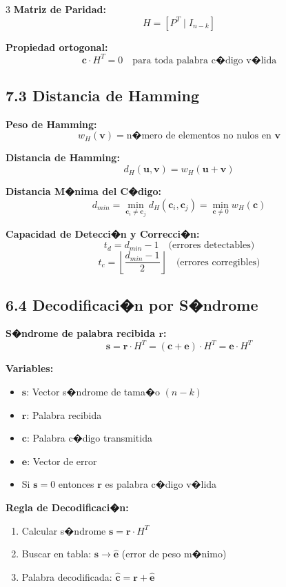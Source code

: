 ﻿\documentclass[8pt,a4paper]{article}
\begin{document}
\begin{multicols}{3}
\textbf{Matriz de Paridad:}
\[
H = [P^T \mid I_{n-k}]
\]

\textbf{Propiedad ortogonal:}
\[
\mathbf{c} \cdot H^T = 0 \quad \text{para toda palabra c�digo v�lida}
\]

\vspace{-2mm}
\subsection*{\small 7.3 Distancia de Hamming}
\vspace{-2mm}

\textbf{Peso de Hamming:}
\[
w_H(\mathbf{v}) = \text{n�mero de elementos no nulos en } \mathbf{v}
\]

\textbf{Distancia de Hamming:}
\[
d_H(\mathbf{u}, \mathbf{v}) = w_H(\mathbf{u} + \mathbf{v})
\]

\textbf{Distancia M�nima del C�digo:}
\[
d_{min} = \min_{\mathbf{c}_i \neq \mathbf{c}_j} d_H(\mathbf{c}_i, \mathbf{c}_j) = \min_{\mathbf{c} \neq 0} w_H(\mathbf{c})
\]

\textbf{Capacidad de Detecci�n y Correcci�n:}
\[
t_d = d_{min} - 1 \quad \text{(errores detectables)}
\]
\[
t_c = \left\lfloor \frac{d_{min} - 1}{2} \right\rfloor \quad \text{(errores corregibles)}
\]

\vspace{-2mm}
\subsection*{\small 6.4 Decodificaci�n por S�ndrome}
\vspace{-2mm}

\textbf{S�ndrome de palabra recibida $\mathbf{r}$:}
\[
\mathbf{s} = \mathbf{r} \cdot H^T = (\mathbf{c} + \mathbf{e}) \cdot H^T = \mathbf{e} \cdot H^T
\]

\textbf{Variables:}
\begin{itemize}[leftmargin=*,itemsep=0pt]
    \item $\mathbf{s}$: Vector s�ndrome de tama�o $(n-k)$
    \item $\mathbf{r}$: Palabra recibida
    \item $\mathbf{c}$: Palabra c�digo transmitida
    \item $\mathbf{e}$: Vector de error
    \item Si $\mathbf{s} = 0$ entonces $\mathbf{r}$ es palabra c�digo v�lida
\end{itemize}

\textbf{Regla de Decodificaci�n:}
\begin{enumerate}[leftmargin=*,itemsep=0pt]
    \item Calcular s�ndrome $\mathbf{s} = \mathbf{r} \cdot H^T$
    \item Buscar en tabla: $\mathbf{s} \rightarrow \hat{\mathbf{e}}$ (error de peso m�nimo)
    \item Palabra decodificada: $\hat{\mathbf{c}} = \mathbf{r} + \hat{\mathbf{e}}$
\end{enumerate}


\end{multicols}
\end{document}
